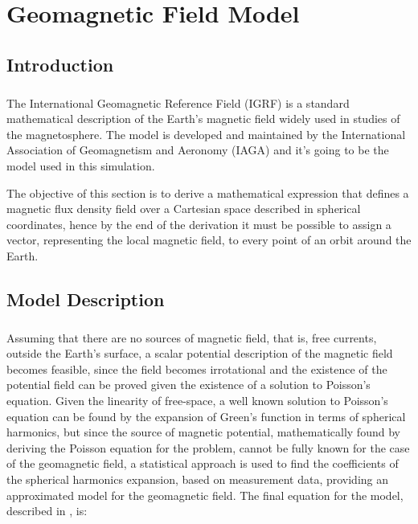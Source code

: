 %
%
%
%
%
%
%
%
%
%

\chapter{Geomagnetic Field Model} \label{ch:geomagnetic-field-model}

\section{Introduction}

\paragraph{}
\indent 
The International Geomagnetic Reference Field (IGRF) is a standard mathematical description of the Earth's magnetic field widely used in studies of the magnetosphere. The model is developed and maintained by the International Association of Geomagnetism and Aeronomy (IAGA) and it's going to be the model used in this simulation.

\indent
The objective of this section is to derive a mathematical expression that defines a magnetic flux density field over a Cartesian space described in spherical coordinates, hence by the end of the derivation it must be possible to assign a vector, representing the local magnetic field, to every point of an orbit around the Earth. 

\section{Model Description}

\paragraph{}
\indent

Assuming that there are no sources of magnetic field, that is, free currents, outside the Earth's surface, a scalar potential description of the magnetic field becomes feasible, since the field becomes irrotational and the existence of the potential field can be proved given the existence of a solution to Poisson's equation. Given the linearity of free-space, a well known solution to Poisson's equation can be found by the expansion of Green's function in terms of spherical harmonics, but since the source of magnetic potential, mathematically found by deriving the Poisson equation for the problem, cannot be fully known for the case of the geomagnetic field, a statistical approach is used to find the coefficients of the spherical harmonics expansion, based on measurement data, providing an approximated model for the geomagnetic field. The final equation for the model, described in \cite{ET}, is: 

